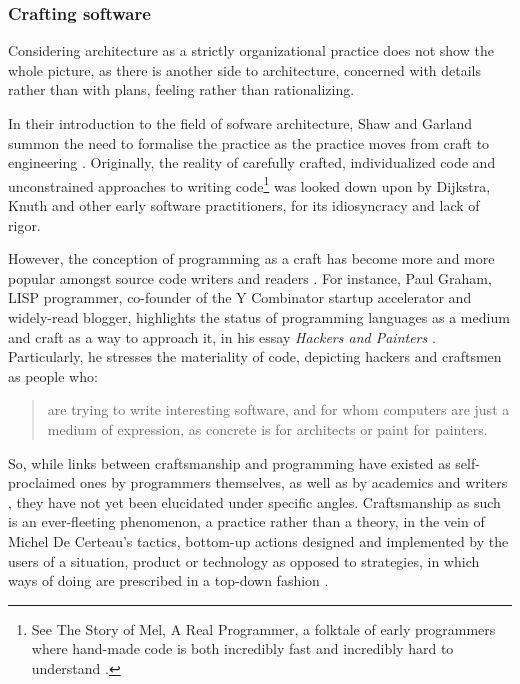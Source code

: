 \subsubsection{Crafting software}
\label{subsubsec:crafting-software}

Considering architecture as a strictly organizational practice does not show the whole picture, as there is another side to architecture, concerned with details rather than with plans, feeling rather than rationalizing.

In their introduction to the field of sofware architecture, Shaw and Garland summon the need to formalise the practice as the practice moves from craft to engineering \citep{shaw_software_1996}. Originally, the reality of carefully crafted, individualized code and unconstrained approaches to writing code\footnote{See The Story of Mel, A Real Programmer, a folktale of early programmers where hand-made code is both incredibly fast and incredibly hard to understand \citep{nather_story_1983}.} was looked down upon by Dijkstra, Knuth and other early software practitioners, for its idiosyncracy and lack of rigor.

However, the conception of programming as a craft has become more and more popular amongst source code writers and readers \citep{spolosky_craftsmanship_2003,seibel_coders_2009}.  For instance, Paul Graham, LISP programmer, co-founder of the Y Combinator startup accelerator and widely-read blogger, highlights the status of programming languages as a medium and craft as a way to approach it, in his essay \emph{Hackers and Painters} \citep{graham_hackers_2003}. Particularly, he stresses the materiality of code, depicting hackers and craftsmen as people who:

\begin{quote}
  are trying to write interesting software, and for whom computers are just a medium of expression, as concrete is for architects or paint for painters.
\end{quote}

So, while links between craftsmanship and programming have existed as self-proclaimed ones by programmers themselves, as well as by academics and writers \citep{sennett_craftsman_2009,chandra_geek_2014}, they have not yet been elucidated under specific angles. Craftsmanship as such is an ever-fleeting phenomenon, a practice rather than a theory, in the vein of Michel De Certeau's tactics, bottom-up actions designed and implemented by the users of a situation, product or technology as opposed to strategies, in which ways of doing are prescribed in a top-down fashion \citep{certeau_invention_1990}.

